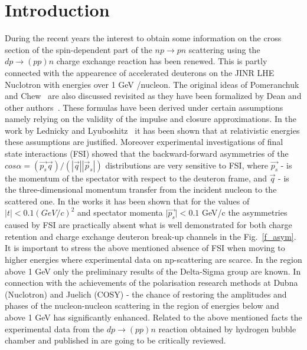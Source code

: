 \documentclass[a4paper,12pt]{article}
\begin{document}
\section {Introduction}
During the recent years the interest to obtain some information on the cross
section of the spin-dependent part of the $np \to pn$ scattering using the
$dp \to  (pp)n$ charge exchange reaction  has been renewed. This is partly
connected with the appearence of accelerated deuterons on  the JINR LHE
Nuclotron with energies over 1 GeV /nucleon. The original ideas of Pomeranchuk
and Chew~\cite{a1} are also discussed revisited  as they have been formalized by
Dean and other authors~\cite{a8}. These formulas have been derived under certain
assumptions namely relying on the validity of the impulse and closure
approximations. In the work by Lednicky and Lyuboshitz~\cite {a2} it has been
shown that at relativistic energies these assumptions are justified. Moreover
experimental investigations of final state interactions (FSI) showed that the
backward-forward asymmetries of the
$ cos \alpha = (\vec {p_s} \vec {q})/({|\vec q|  |\vec p_{s}|}) $ distributions
are very sensitive to FSI, where $ \vec {p_s} $ - is the momentum of the
spectator with respect to the deuteron frame, and $ \vec {q} $ - is the
three-dimensional momentum transfer from the incident nucleon to the scattered
one. In the works \cite {a3, a4} it has been shown that for the values of
$ \vert t\vert <0.1 (GeV/c)^{2} $ and spectator momenta
$ \vert{\vec {p_s}}\vert < 0.1 $ GeV/c the asymmetries caused by FSI are
practically absent what is well demonstrated for both charge retention and
charge exchange deuteron break-up channels in the Fig.~\ref {f_asym}. It is
important to stress the above mentioned absence of FSI when moving to higher
energies where experimental data on np-scattering are scarce.  In the region
above 1 GeV only the preliminary results of the Delta-Sigma group \cite {a5} are
known. In connection with the achievements of the polarisation research methods
at Dubna (Nuclotron) and Juelich (COSY) - the chance of restoring the amplitudes
and phases of the nucleon-nucleon scattering in the region of energies below and
above 1 GeV has significantly enhanced. Related to the above mentioned facts the
experimental data from the $dp \to (pp)n$ reaction obtained by hydrogen bubble
chamber and published in \cite {a6} are going to be critically reviewed.
\end{document}
